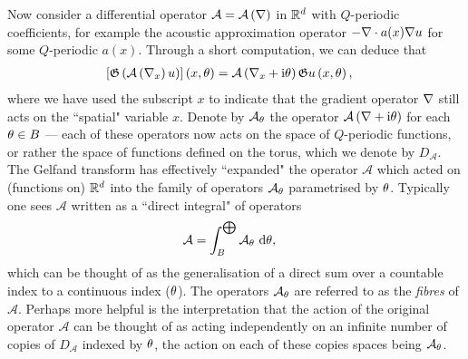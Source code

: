 Now consider a differential operator $\mathcal{A} = \mathcal{A}\left( \nabla \right)$ in $\mathbb{R}^d$ with $Q$-periodic coefficients, for example the acoustic approximation operator $-\nabla\cdot a(x)\nabla u$ for some $Q$-periodic $a(x)$.
Through a short computation, we can deduce that
\begin{align*}
	\left[ \mathfrak{G}\left( \mathcal{A}\left( \nabla_x \right)u \right) \right](x,\theta) 
	&= \mathcal{A}\left( \nabla_x + \mathrm{i}\theta \right)\mathfrak{G} u\left( x,\theta \right),
\end{align*}
where we have used the subscript $x$ to indicate that the gradient operator $\nabla$ still acts on the ``spatial" variable $x$.
Denote by $\mathcal{A}_{\theta}$ the operator $\mathcal{A}\left( \nabla+\mathrm{i}\theta \right)$ for each $\theta\in B$ --- each of these operators now acts on the space of $Q$-periodic functions, or rather the space of functions defined on the torus, which we denote by $D_{\mathcal{A}}$.
The Gelfand transform has effectively ``expanded" the operator $\mathcal{A}$ which acted on (functions on) $\mathbb{R}^d$ into the family of operators $\mathcal{A}_{\theta}$ parametrised by $\theta$.
Typically one sees $\mathcal{A}$ written as a ``direct integral" of operators
\begin{align*}
	\mathcal{A} &= \int_{B}^{\bigoplus}\mathcal{A}_{\theta} \ \mathrm{d}\theta,
\end{align*}
 which can be thought of as the generalisation of a direct sum over a countable index to a continuous index ($\theta$).
The operators $\mathcal{A}_{\theta}$ are referred to as the \emph{fibres} of $\mathcal{A}$.
Perhaps more helpful is the interpretation that the action of the original operator $\mathcal{A}$ can be thought of as acting independently on an infinite number of copies of $D_{\mathcal{A}}$ indexed by $\theta$, the action on each of these copies spaces being $\mathcal{A}_{\theta}$.
